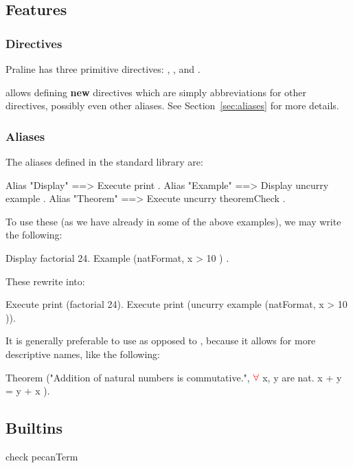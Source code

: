 \subsection{Features}

\subsubsection{Directives}

Praline has three primitive directives: , , and .

 allows defining \textbf{new} directives which are simply abbreviations for other directives, possibly even other aliases. 
See Section~\ref{sec:aliases} for more details.

\subsubsection{Aliases}

The aliases defined in the standard library are:

\begin{pecan}
Alias "Display" ==> Execute print .
Alias "Example" ==> Display uncurry example .
Alias "Theorem" ==> Execute uncurry theoremCheck .
\end{pecan}

To use these (as we have already in some of the above examples), we may write the following:
\begin{pecan}
Display factorial 24.
Example (natFormat, { x > 10 }) .
\end{pecan}
These rewrite into:
\begin{pecan}
Execute print (factorial 24).
Execute print (uncurry example (natFormat, {x > 10 })).
\end{pecan}

It is generally preferable to use  as opposed to , because it allows for more descriptive names, like the following:
\begin{pecan}
Theorem ("Addition of natural numbers is commutative.", {
    $\color{red} \forall$ x, y are nat. x + y = y + x
}).
\end{pecan}

\subsection{Builtins}

\begin{pecan}
check pecanTerm
\end{pecan}

